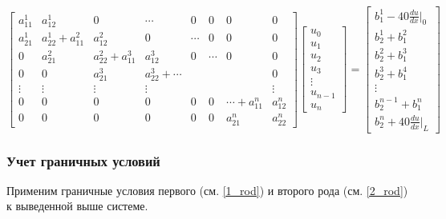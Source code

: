 $$ \begin{bmatrix}
a_{11}^1     &   a_{12}^1         &   0 & \cdots & 0 & 0 & 0  & 0\\
a_{21}^1     &    a_{22}^1+a_{11}^2 & a_{12}^2  & 0 & \cdots & 0 & 0  & 0\\
0     &    a_{21}^2 & a_{22}^2+a_{11}^3  &  a_{12}^3  & 0 & \cdots & 0  & 0\\
0     &    0  & a_{21}^3  & a_{22}^3+ \cdots  &  & &   & 0\\
\vdots & \vdots & \vdots & \vdots &  &  &   & \vdots\\
0 & 0 & 0 & 0 &  0 & 0 & \cdots+a_{11}^n  & a_{12}^n\\
0 & 0 & 0 & 0 &  0 & 0 & a_{21}^n  & a_{22}^n
\end{bmatrix}
\begin{bmatrix}
u_0 \\
u_1 \\
u_2\\
u_3\\
\vdots\\
u_{n-1}\\
u_n
\end{bmatrix} =
\begin{bmatrix}
b_1^1   -40  \frac{du}{dx}|_0 \\
b_2^1+b_1^2\\
b_2^2+b_1^3\\
b_2^3+b_1^4\\
\vdots\\
b_2^{n-1}+b_1^n\\
b_2^n   +40  \frac{du}{dx}|_L
\end{bmatrix}
$$

\subsubsection{Учет граничных условий}

Применим граничные условия первого (см. \ref{1_rod}) и второго рода (см. \ref{2_rod}) к выведенной выше системе.


